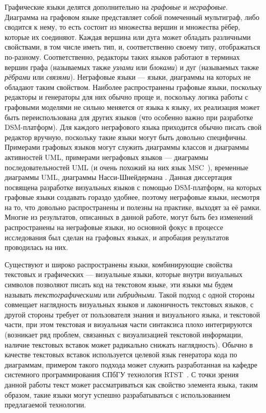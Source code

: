 Графические языки делятся дополнительно на \textit{графовые} и \textit{неграфовые}. Диаграмма на 
графовом языке представляет собой помеченный мультиграф, либо сводится к нему, то 
есть состоит из множества вершин и множества рёбер, которые их соединяют. Каждая вершина 
или дуга может обладать различными свойствами, в том числе иметь тип, и, соответственно 
своему типу, отображаться по-разному. Соответственно, редакторы таких языков работают в терминах вершин графа (называемых также 
\textit{узлами} или \textit{блоками}) и дуг (называемых также \textit{рёбрами} или \textit{связями}). Неграфовые языки --- 
языки, диаграммы на которых не обладают таким свойством. Наиболее распространены 
графовые языки, поскольку редакторы и генераторы для них обычно проще и, 
поскольку логика работы с графовыми моделями не сильно меняется от языка к 
языку, их реализация может быть переиспользована для других языков (что особенно 
важно при разработке \ac{DSM}-платформ). Для каждого неграфового языка приходится 
обычно писать свой редактор вручную, поскольку такие языки могут быть довольно 
специфичны. Примерами графовых языков могут служить диаграммы классов и 
диаграммы активностей \ac{UML}, примерами неграфовых языков --- диаграммы 
последовательностей \ac{UML} (и очень похожий на них язык MSC~\cite{mauw1996formalization}), 
временные диаграммы \ac{UML}, диаграммы Насси-Шнейдермана%
. Данная диссертация посвящена разработке визуальных языков с помощью 
\ac{DSM}-платформ, на которых графовые языки создавать гораздо удобнее, поэтому 
неграфовые языки, несмотря на то, что довольно распространены и полезны на 
практике, выходят за её рамки. Многие из результатов, описанных в данной работе, могут 
быть без изменений распространены на неграфовые языки, но основной фокус в процессе 
исследования был сделан на графовых языках, и апробация результатов проводилась на них.

Существуют и широко распространены языки, комбинирующие свойства текстовых и 
графических --- визуальные языки, которые внутри визуальных символов позволяют 
писать код на текстовом языке, эти языки мы будем называть \textit{текстографическими} или \textit{гибридными}. 
Такой подход с одной стороны совмещает наглядность визуальных языков и лаконичность текстовых языков, с другой стороны 
требует от пользователя знания и визуального языка, и текстовой части, при этом 
текстовая и визуальная части синтаксиса плохо интегрируются (возникает ряд 
проблем, связанных с визуализацией текстовой информации, наличие текстовых
вставок может радикально снижать наглядность). Обычно в качестве текстовых 
вставок используется целевой язык генератора кода по диаграммам, примером такого 
подхода может служить разработанная на кафедре системного программирования СПбГУ 
технология RTST~\cite{parfenov1997rtst, terekhov1998rtst}. 
С точки зрения данной работы текст может рассматриваться как свойство элемента 
языка, таким образом, такие языки могут успешно разрабатываться с использованием 
предлагаемой технологии.


